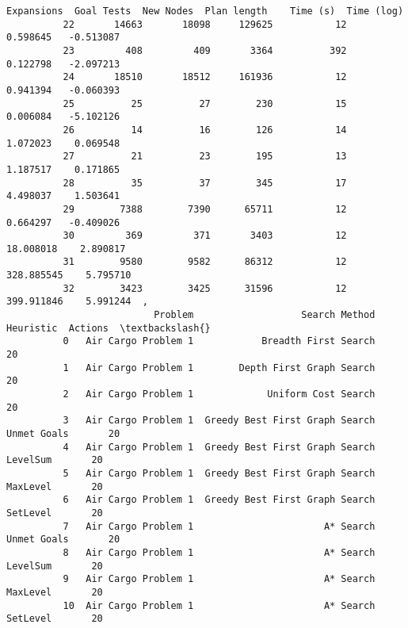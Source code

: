 \documentclass[11pt]{article}
\begin{document}
\begin{Verbatim}[commandchars=\\\{\}]
              Expansions  Goal Tests  New Nodes  Plan length    Time (s)  Time (log)  
          22       14663       18098     129625           12    0.598645   -0.513087  
          23         408         409       3364          392    0.122798   -2.097213  
          24       18510       18512     161936           12    0.941394   -0.060393  
          25          25          27        230           15    0.006084   -5.102126  
          26          14          16        126           14    1.072023    0.069548  
          27          21          23        195           13    1.187517    0.171865  
          28          35          37        345           17    4.498037    1.503641  
          29        7388        7390      65711           12    0.664297   -0.409026  
          30         369         371       3403           12   18.008018    2.890817  
          31        9580        9582      86312           12  328.885545    5.795710  
          32        3423        3425      31596           12  399.911846    5.991244  ,
                          Problem                   Search Method    Heuristic  Actions  \textbackslash{}
          0   Air Cargo Problem 1            Breadth First Search                    20   
          1   Air Cargo Problem 1        Depth First Graph Search                    20   
          2   Air Cargo Problem 1             Uniform Cost Search                    20   
          3   Air Cargo Problem 1  Greedy Best First Graph Search  Unmet Goals       20   
          4   Air Cargo Problem 1  Greedy Best First Graph Search     LevelSum       20   
          5   Air Cargo Problem 1  Greedy Best First Graph Search     MaxLevel       20   
          6   Air Cargo Problem 1  Greedy Best First Graph Search     SetLevel       20   
          7   Air Cargo Problem 1                       A* Search  Unmet Goals       20   
          8   Air Cargo Problem 1                       A* Search     LevelSum       20   
          9   Air Cargo Problem 1                       A* Search     MaxLevel       20   
          10  Air Cargo Problem 1                       A* Search     SetLevel       20   
          

\end{Verbatim}
\end{document}
